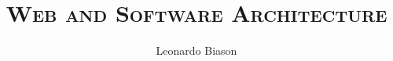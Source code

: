 \documentclass{../../../NoTeX/notex}
\title{\textsc{Web and Software Architecture}}
\author{Leonardo Biason}
\begin{document}
    \maketitle	

    
    \pagebreak
    
\end{document}
